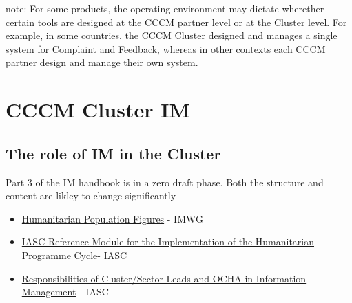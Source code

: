 \documentclass[
  a4paper,
  onecolumn,
  oneside]{book}
\providecommand{\tightlist}{%
  \setlength{\itemsep}{0pt}\setlength{\parskip}{0pt}}\usepackage{longtable,booktabs,array}
\begin{document}
note: For some products, the operating environment may dictate wherether
certain tools are designed at the CCCM partner level or at the Cluster
level. For example, in some countries, the CCCM Cluster designed and
manages a single system for Complaint and Feedback, whereas in other
contexts each CCCM partner design and manage their own system.

\part{CCCM Cluster IM}

\hypertarget{the-role-of-im-in-the-cluster}{%
\chapter{The role of IM in the
Cluster}\label{the-role-of-im-in-the-cluster}}

\begin{tcolorbox}[enhanced jigsaw, leftrule=.75mm, arc=.35mm, breakable, toprule=.15mm, opacitybacktitle=0.6, title=\textcolor{quarto-callout-warning-color}{\faExclamationTriangle}\hspace{0.5em}{Warning}, toptitle=1mm, colframe=quarto-callout-warning-color-frame, left=2mm, opacityback=0, rightrule=.15mm, colback=white, coltitle=black, bottomrule=.15mm, colbacktitle=quarto-callout-warning-color!10!white, bottomtitle=1mm, titlerule=0mm]

Part 3 of the IM handbook is in a zero draft phase. Both the structure
and content are likley to change significantly

\end{tcolorbox}

\begin{tcolorbox}[enhanced jigsaw, leftrule=.75mm, arc=.35mm, breakable, toprule=.15mm, opacitybacktitle=0.6, title=\textcolor{quarto-callout-tip-color}{\faLightbulb}\hspace{0.5em}{Recommended reading}, toptitle=1mm, colframe=quarto-callout-tip-color-frame, left=2mm, opacityback=0, rightrule=.15mm, colback=white, coltitle=black, bottomrule=.15mm, colbacktitle=quarto-callout-tip-color!10!white, bottomtitle=1mm, titlerule=0mm]

\begin{itemize}
\tightlist
\item
  \href{files/humanitarianprofilesupportguidance_final_may2016.pdf}{Humanitarian
  Population Figures} - IMWG
\item
  \href{files/humanitarianprofilesupportguidance_final_may2016.pdf}{IASC
  Reference Module for the Implementation of the Humanitarian Programme
  Cycle}- IASC
\item
  \href{files/Operational\%20Guidance\%20on\%20Responsibilities\%20of\%20Cluster-Sector\%20Leads\%20and\%20OCHA\%20in\%20Information\%20Management.pdf}{Responsibilities
  of Cluster/Sector Leads and OCHA in Information Management} - IASC
\end{itemize}

\end{tcolorbox}
\end{document}
